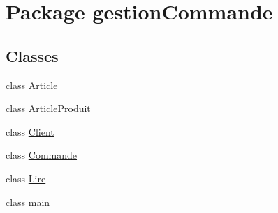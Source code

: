 \hypertarget{namespacegestion_commande}{\section{Package gestion\-Commande}
\label{namespacegestion_commande}
}
\subsection*{Classes}
\begin{DoxyCompactItemize}
\item 
class \hyperlink{classgestion_commande_1_1_article}{Article}
\item 
class \hyperlink{classgestion_commande_1_1_article_produit}{Article\-Produit}
\item 
class \hyperlink{classgestion_commande_1_1_client}{Client}
\item 
class \hyperlink{classgestion_commande_1_1_commande}{Commande}
\item 
class \hyperlink{classgestion_commande_1_1_lire}{Lire}
\item 
class \hyperlink{classgestion_commande_1_1main}{main}
\end{DoxyCompactItemize}
